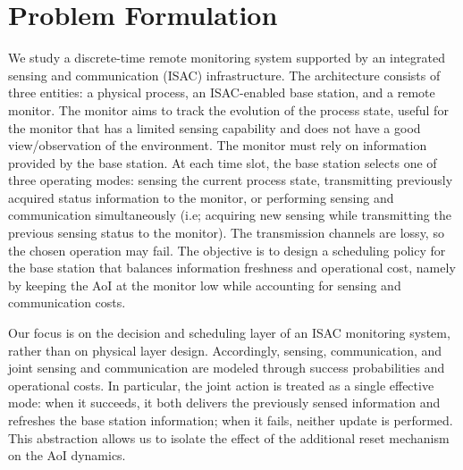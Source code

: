 \documentclass[letterpaper,journal]{IEEEtran}
\begin{document}

\section{Problem Formulation}\label{sec:prolem-formulation}

We study a discrete-time remote monitoring system supported by an integrated sensing and communication (ISAC) infrastructure. The architecture consists of three entities: a physical process, an ISAC-enabled base station, and a remote monitor. The monitor aims to track the evolution of the process state, useful for the monitor that has a  limited sensing capability and does not have a good view/observation of the environment. The monitor must rely on information provided by the base station. At each time slot, the base station selects one of three operating modes: sensing the current process state, transmitting previously acquired status information to the monitor, or performing sensing and communication simultaneously (i.e; acquiring new sensing while transmitting the previous sensing status to the monitor). The transmission channels are lossy, so the chosen operation may fail. The objective is to design a scheduling policy for the base station that balances information freshness and operational cost, namely by keeping the AoI at the monitor low while accounting for sensing and communication costs.

Our focus is on the decision and scheduling layer of an ISAC monitoring system, rather than on physical layer design. Accordingly, sensing, communication, and joint sensing and communication are modeled through success probabilities and operational costs. In particular, the joint action is treated as a single effective mode: when it succeeds, it both delivers the previously sensed information and refreshes the base station information; when it fails, neither update is performed. This abstraction allows us to isolate the effect of the additional reset mechanism on the AoI dynamics.
\end{document}
